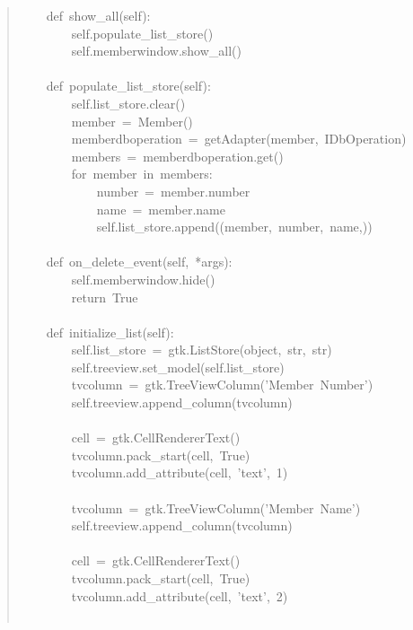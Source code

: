 \documentclass[14pt,a4paper,openany,twoside,final]{extbook}
\begin{document}
\begin{quote}
{~~~~def~show\_all(self):\\
~~~~~~~~self.populate\_list\_store()\\
~~~~~~~~self.memberwindow.show\_all()\\
~\\
~~~~def~populate\_list\_store(self):\\
~~~~~~~~self.list\_store.clear()\\
~~~~~~~~member~=~Member()\\
~~~~~~~~memberdboperation~=~getAdapter(member,~IDbOperation)\\
~~~~~~~~members~=~memberdboperation.get()\\
~~~~~~~~for~member~in~members:\\
~~~~~~~~~~~~number~=~member.number\\
~~~~~~~~~~~~name~=~member.name\\
~~~~~~~~~~~~self.list\_store.append((member,~number,~name,))\\
~\\
~~~~def~on\_delete\_event(self,~*args):\\
~~~~~~~~self.memberwindow.hide()\\
~~~~~~~~return~True\\
~\\
~~~~def~initialize\_list(self):\\
~~~~~~~~self.list\_store~=~gtk.ListStore(object,~str,~str)\\
~~~~~~~~self.treeview.set\_model(self.list\_store)\\
~~~~~~~~tvcolumn~=~gtk.TreeViewColumn('Member~Number')\\
~~~~~~~~self.treeview.append\_column(tvcolumn)\\
~\\
~~~~~~~~cell~=~gtk.CellRendererText()\\
~~~~~~~~tvcolumn.pack\_start(cell,~True)\\
~~~~~~~~tvcolumn.add\_attribute(cell,~'text',~1)\\
~\\
~~~~~~~~tvcolumn~=~gtk.TreeViewColumn('Member~Name')\\
~~~~~~~~self.treeview.append\_column(tvcolumn)\\
~\\
~~~~~~~~cell~=~gtk.CellRendererText()\\
~~~~~~~~tvcolumn.pack\_start(cell,~True)\\
~~~~~~~~tvcolumn.add\_attribute(cell,~'text',~2)\\
~\\
}
\end{quote}
\end{document}
